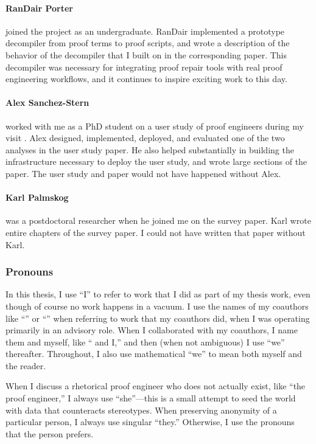 \paragraph{RanDair Porter}
 joined the project as an undergraduate.
RanDair implemented a prototype decompiler from proof terms to proof scripts,
and wrote a description of the behavior of the decompiler that I built on in the corresponding paper.
This decompiler was necessary for integrating proof repair tools with real proof engineering workflows,
and it continues to inspire exciting work to this day.

\paragraph{Alex Sanchez-Stern}
 worked with me as a PhD student on a user study of proof engineers during my visit .
Alex designed, implemented, deployed, and evaluated one of the two analyses in the user study paper.
He also helped substantially in building the infrastructure necessary to deploy the user study,
and wrote large sections of the paper.
The user study and paper would not have happened without Alex.

\paragraph{Karl Palmskog}
 was a postdoctoral researcher when he joined me on the survey paper.
Karl wrote entire chapters of the survey paper.
I could not have written that paper without Karl.

\subsubsection*{Pronouns}

In this thesis, I use ``I'' to refer to work that I did as part of my thesis work,
even though of course no work happens in a vacuum.
I use the names of my coauthors like ``'' or ``'' when referring to work that my coauthors did,
when I was operating primarily in an advisory role.
When I collaborated with my coauthors, I name them and myself, like `` and I,''
and then (when not ambiguous) I use ``we'' thereafter.
Throughout, I also use mathematical ``we'' to mean both myself and the reader.

When I discuss a rhetorical proof engineer who does not actually exist,
like ``the proof engineer,'' I always use ``she''---this is a small attempt
to seed the world with data that counteracts stereotypes. 
When preserving anonymity of a particular person, I always use singular ``they.''
Otherwise, I use the pronouns that the person prefers.



